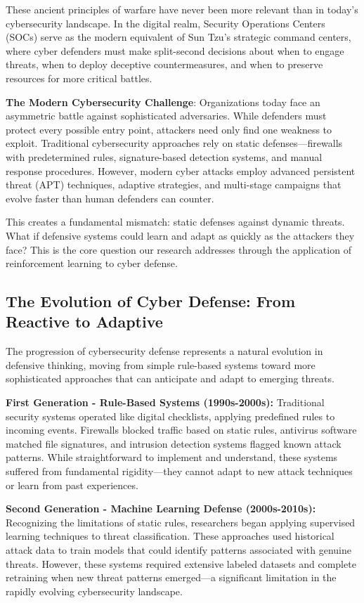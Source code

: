 \documentclass[12pt,twoside]{article}
\theoremstyle{definition}
\theoremstyle{plain}
\begin{document}
These ancient principles of warfare have never been more relevant than in today's cybersecurity landscape. In the digital realm, Security Operations Centers (SOCs) serve as the modern equivalent of Sun Tzu's strategic command centers, where cyber defenders must make split-second decisions about when to engage threats, when to deploy deceptive countermeasures, and when to preserve resources for more critical battles.

\textbf{The Modern Cybersecurity Challenge}: Organizations today face an asymmetric battle against sophisticated adversaries. While defenders must protect every possible entry point, attackers need only find one weakness to exploit. Traditional cybersecurity approaches rely on static defenses—firewalls with predetermined rules, signature-based detection systems, and manual response procedures. However, modern cyber attacks employ advanced persistent threat (APT) techniques, adaptive strategies, and multi-stage campaigns that evolve faster than human defenders can counter.

This creates a fundamental mismatch: static defenses against dynamic threats. What if defensive systems could learn and adapt as quickly as the attackers they face? This is the core question our research addresses through the application of reinforcement learning to cyber defense.

\subsection{The Evolution of Cyber Defense: From Reactive to Adaptive}

The progression of cybersecurity defense represents a natural evolution in defensive thinking, moving from simple rule-based systems toward more sophisticated approaches that can anticipate and adapt to emerging threats.

\textbf{First Generation - Rule-Based Systems (1990s-2000s):} Traditional security systems operated like digital checklists, applying predefined rules to incoming events. Firewalls blocked traffic based on static rules, antivirus software matched file signatures, and intrusion detection systems flagged known attack patterns. While straightforward to implement and understand, these systems suffered from fundamental rigidity—they cannot adapt to new attack techniques or learn from past experiences.

\textbf{Second Generation - Machine Learning Defense (2000s-2010s):} Recognizing the limitations of static rules, researchers began applying supervised learning techniques to threat classification. These approaches used historical attack data to train models that could identify patterns associated with genuine threats. However, these systems required extensive labeled datasets and complete retraining when new threat patterns emerged—a significant limitation in the rapidly evolving cybersecurity landscape.
\end{document}
